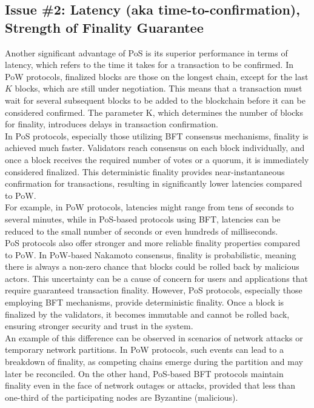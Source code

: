 \subsection{Issue \#2: Latency (aka time-to-confirmation), Strength of Finality Guarantee}
Another significant advantage of PoS is its superior performance in terms of latency, which refers to the time it takes for a transaction to be confirmed. In PoW protocols, finalized blocks are those on the longest chain, except for the last $K$ blocks, which are still under negotiation. This means that a transaction must wait for several subsequent blocks to be added to the blockchain before it can be considered confirmed. The parameter K, which determines the number of blocks for finality, introduces delays in transaction confirmation.\\
In PoS protocols, especially those utilizing BFT consensus mechanisms, finality is achieved much faster. Validators reach consensus on each block individually, and once a block receives the required number of votes or a quorum, it is immediately considered finalized. This deterministic finality provides near-instantaneous confirmation for transactions, resulting in significantly lower latencies compared to PoW.\\
For example, in PoW protocols, latencies might range from tens of seconds to several minutes, while in PoS-based protocols using BFT, latencies can be reduced to the small number of seconds or even hundreds of milliseconds.\\
PoS protocols also offer stronger and more reliable finality properties compared to PoW. In PoW-based Nakamoto consensus, finality is probabilistic, meaning there is always a non-zero chance that blocks could be rolled back by malicious actors. This uncertainty can be a cause of concern for users and applications that require guaranteed transaction finality. However, PoS protocols, especially those employing BFT mechanisms, provide deterministic finality. Once a block is finalized by the validators, it becomes immutable and cannot be rolled back, ensuring stronger security and trust in the system.\\
An example of this difference can be observed in scenarios of network attacks or temporary network partitions. In PoW protocols, such events can lead to a breakdown of finality, as competing chains emerge during the partition and may later be reconciled. On the other hand, PoS-based BFT protocols maintain finality even in the face of network outages or attacks, provided that less than one-third of the participating nodes are Byzantine (malicious).

